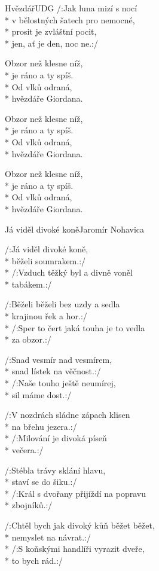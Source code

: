 \documentclass[10.5pt]{book}
\begin{document}
\begin{poem}{Hvězdář}{UDG}
/:Jak luna mizí s nocí\\*
v bělostných šatech pro nemocné,\\*
prosit je zvláštní pocit,\\*
jen, ať je den, noc ne.:/

Obzor než klesne níž, \\*
je ráno a ty spíš.\\*
Od vlků odraná, \\*
hvězdáře Giordana.

Obzor než klesne níž, \\*
je ráno a ty spíš.\\*
Od vlků odraná, \\*
hvězdáře Giordana.

Obzor než klesne níž, \\*
je ráno a ty spíš.\\*
Od vlků odraná, \\*
hvězdáře Giordana.
\end{poem}

\begin{poem}{Já viděl divoké koně}{Jaromír Nohavica}

\settowidth{\versewidth}{Běželi běželi bez uzdy a sedla}

/:Já viděl divoké koně, \\*
běželi soumrakem.:/\\*
/:Vzduch těžký byl a divně voněl\\*
tabákem.:/

/:Běželi běželi bez uzdy a sedla\\*
krajinou řek a hor.:/\\*
/:Sper to čert jaká touha je to vedla\\*
za obzor.:/

/:Snad vesmír nad vesmírem, \\*
snad lístek na věčnost.:/\\*
/:Naše touho ještě neumírej, \\*
sil máme dost.:/

/:V nozdrách sládne zápach klisen \\*
na břehu jezera.:/\\*
/:Milování je divoká píseň \\*
večera.:/

/:Stébla trávy sklání hlavu, \\*
staví se do šiku.:/\\*
/:Král s dvořany přijíždí na popravu \\*
zbojníků.:/

/:Chtěl bych jak divoký kůň běžet běžet,\\* 
nemyslet na návrat.:/\\*
/:S koňskými handlíři vyrazit dveře, \\*
to bych rád.:/

\end{poem}
\end{document}
